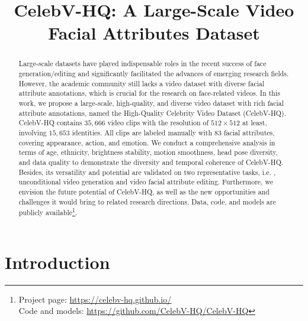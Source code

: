 \title{CelebV-HQ: A Large-Scale Video Facial Attributes Dataset}

\begin{abstract}
Large-scale datasets have played indispensable roles in the recent success of face generation/editing and significantly facilitated the advances of emerging research fields. However, the academic community still lacks a video dataset with diverse facial attribute annotations, which is crucial for the research on face-related videos. In this work, we propose a large-scale, high-quality, and diverse video dataset with rich facial attribute annotations, named the High-Quality Celebrity Video Dataset (CelebV-HQ). CelebV-HQ contains $35,666$ video clips with the resolution of $512\times512$ at least, involving $15,653$ identities. All clips are labeled manually with $83$ facial attributes, covering appearance, action, and emotion. We conduct a comprehensive analysis in terms of age, ethnicity, brightness stability, motion smoothness, head pose diversity, and data quality to demonstrate the diversity and temporal coherence of CelebV-HQ. Besides, its versatility and potential are validated on two representative tasks, i.e. , unconditional video generation and video facial attribute editing. Furthermore, we envision the future potential of CelebV-HQ, as well as the new opportunities and challenges it would bring to related research directions. Data, code, and models are publicly available\footnote{Project page: \url{https://celebv-hq.github.io/} \\
Code and models: \url{https://github.com/CelebV-HQ/CelebV-HQ}}.
\end{abstract}

\section{Introduction}


